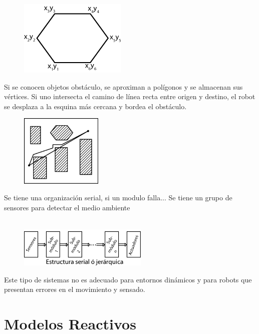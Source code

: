\begin{figure}
  \begin{center}
    \includegraphics[width = 3 cm]{images/img3.png}
  \end{center}
    
\end{figure}


Si se conocen objetos obstáculo, se aproximan a polígonos y se almacenan sus vértices. Si uno intersecta el camino de línea recta entre origen y destino, el robot se desplaza a la esquina más cercana y bordea el obstáculo.

\begin{figure}[h!]
	\centering
	\includegraphics[width=0.35\textwidth]{images/img2.png}
\end{figure}

Se tiene una organización serial, si un modulo falla... 
Se tiene un grupo de sensores para detectar el medio ambiente
\\
\\

\begin{figure}[h!]
	\centering
	\includegraphics[width=0.55\textwidth]{images/img4.png}
	\label{figura4}
\end{figure}

Este tipo de sistemas no es adecuado para entornos dinámicos y para robots que presentan errores en el movimiento y sensado.



\section{Modelos Reactivos}


